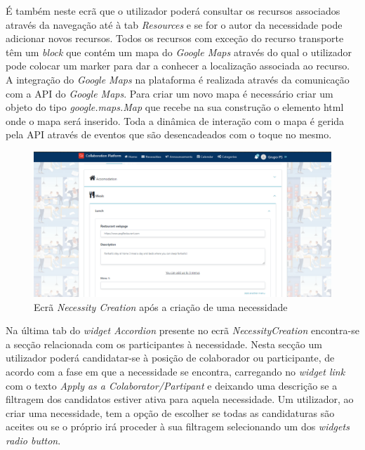 É também neste ecrã que o utilizador poderá consultar os recursos associados através da navegação até à tab \textit{Resources} e se for o autor da necessidade pode adicionar novos recursos. 
Todos os recursos com exceção do recurso transporte têm um \textit{block} que contém um mapa do \textit{Google Maps} através do qual o utilizador pode colocar um marker para dar a conhecer a localização associada ao recurso. 
A integração do \textit{Google Maps} na plataforma é realizada através da comunicação com a API do \textit{Google Maps}. Para criar um novo mapa é necessário criar um objeto do tipo \textit{google.maps.Map} que recebe na sua construção o elemento html onde o mapa será inserido. 
Toda a dinâmica de interação com o mapa é gerida pela API através de eventos que são desencadeados com o toque no mesmo. 

\begin{figure}[H]
  \centering 
  \includegraphics[scale=0.4]{figures/Resources1.png}
  \caption{Ecrã \textit{Necessity Creation} após a criação de uma necessidade}\label{fig:NecessityCreationWithResourcesAndParticipants}
\end{figure}


Na última tab do \textit{widget Accordion} presente no ecrã \textit{NecessityCreation} encontra-se a secção relacionada com os participantes à necessidade. 
Nesta secção um utilizador poderá candidatar-se à posição de colaborador ou participante, de acordo com a fase em que a necessidade se encontra, carregando no \textit{widget link} com o texto \textit{Apply as a Colaborator/Partipant} e deixando uma descrição se a filtragem dos candidatos estiver ativa para aquela necessidade.
Um utilizador, ao criar uma necessidade, tem a opção de escolher se todas as candidaturas são aceites ou se o próprio irá proceder à sua filtragem selecionando um dos \textit{widgets radio button}.  